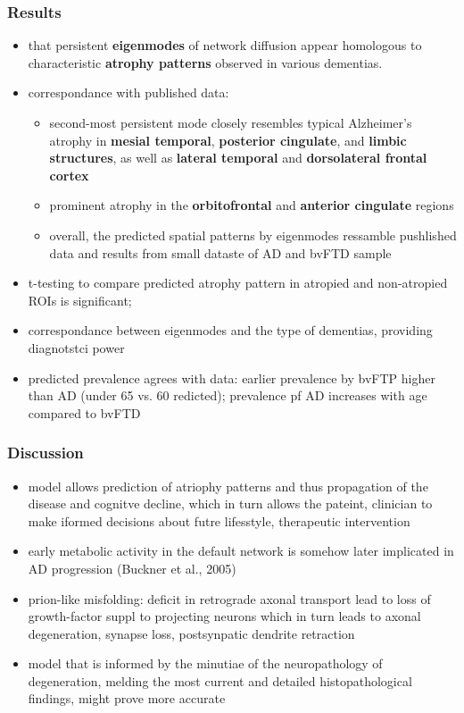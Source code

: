 \documentclass[fleqn]{article}\usepackage{caption}
\begin{document}
\subsubsection{Results}
\begin{itemize}
\item that persistent \textbf{eigenmodes} of network diffusion appear homologous to characteristic \textbf{atrophy patterns} observed in various dementias.
\item correspondance with published data:
\begin{itemize}
\item second-most persistent mode closely resembles typical Alzheimer’s atrophy in \textbf{mesial temporal}, \textbf{posterior cingulate}, and \textbf{limbic structures}, as well as \textbf{lateral temporal} and \textbf{dorsolateral frontal cortex}
\item prominent atrophy in the \textbf{orbitofrontal} and \textbf{anterior cingulate} regions
\item overall, the predicted spatial patterns by eigenmodes ressamble pushlished data and results from small dataste of AD and bvFTD sample
\end{itemize}
\item t-testing to compare predicted atrophy pattern in atropied and non-atropied ROIs is significant; 
\item correspondance between eigenmodes and the type of dementias, providing diagnotstci power  
\item predicted prevalence agrees with data: earlier prevalence by bvFTP higher than AD (under 65 vs. 60 redicted); prevalence pf AD increases with age compared to bvFTD
\end{itemize}


\subsubsection{Discussion}
\begin{itemize}
\item model allows prediction of atriophy patterns and thus propagation of the disease and cognitve decline, which in turn allows the pateint, clinician to make iformed decisions about futre lifesstyle, therapeutic intervention
\item early metabolic activity in the default network is somehow later implicated in AD progression (Buckner et al., 2005)
\item prion-like misfolding: deficit in retrograde axonal transport lead to loss of growth-factor suppl to projecting neurons which in turn leads to axonal degeneration, synapse loss, postsynpatic dendrite retraction
\item model that is informed by the minutiae of the neuropathology of degeneration, melding the most current and detailed histopathological findings, might prove more accurate 
\end{itemize}
\end{document}
